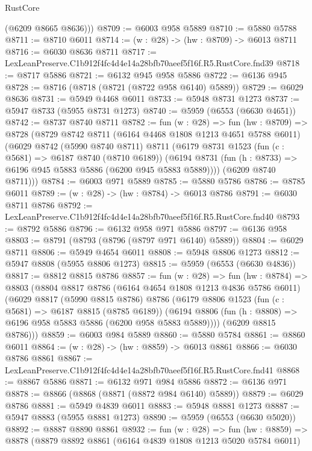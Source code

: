 \begin{lexlean}{RustCore}
\begin{coremodule}
        (@6209 @8665 @8636)))
@8709 := @6003 @958 @5889
@8710 := @5880 @5788
@8711 := @8710 @6011
@8714 := (w : @28) -> (hw : @8709) -> @6013 @8711
@8716 := @6030 @8636 @8711
@8717 := LexLeanPreserve.C1b912f4fc4d4e14a28bfb70aeef5f16f.R5.RustCore.fnd39
@8718 := @8717 @5886
@8721 := @6132 @945 @958 @5886
@8722 := @6136 @945
@8728 := @8716 (@8718 (@8721 (@8722 @958 @6140) @5889))
@8729 := @6029 @8636
@8731 := @5949 @4468 @6011
@8733 := @5948 @8731 @1273
@8737 := @5947 @8733 (@5955 @8731 @1273)
@8740 := @5959 (@6553 (@6630 @4651))
@8742 := @8737 @8740 @8711
@8782 := fun (w : @28) =>
  fun (hw : @8709) =>
  @8728
    (@8729
      @8742
      @8711
      (@6164 @4468 @1808 @1213 @4651 @5788 @6011)
      (@6029
        @8742
        (@5990 @8740 @8711)
        @8711
        (@6179
          @8731
          @1523
          (fun (c : @5681) => @6187 @8740 (@8710 @6189))
          (@6194 @8731 (fun (h : @8733) => @6196 @945 @5883 @5886 (@6200 @945 @5883 @5889))))
        (@6209 @8740 @8711)))
@8784 := @6003 @971 @5889
@8785 := @5880 @5786
@8786 := @8785 @6011
@8789 := (w : @28) -> (hw : @8784) -> @6013 @8786
@8791 := @6030 @8711 @8786
@8792 := LexLeanPreserve.C1b912f4fc4d4e14a28bfb70aeef5f16f.R5.RustCore.fnd40
@8793 := @8792 @5886
@8796 := @6132 @958 @971 @5886
@8797 := @6136 @958
@8803 := @8791 (@8793 (@8796 (@8797 @971 @6140) @5889))
@8804 := @6029 @8711
@8806 := @5949 @4654 @6011
@8808 := @5948 @8806 @1273
@8812 := @5947 @8808 (@5955 @8806 @1273)
@8815 := @5959 (@6553 (@6630 @4836))
@8817 := @8812 @8815 @8786
@8857 := fun (w : @28) =>
  fun (hw : @8784) =>
  @8803
    (@8804
      @8817
      @8786
      (@6164 @4654 @1808 @1213 @4836 @5786 @6011)
      (@6029
        @8817
        (@5990 @8815 @8786)
        @8786
        (@6179
          @8806
          @1523
          (fun (c : @5681) => @6187 @8815 (@8785 @6189))
          (@6194 @8806 (fun (h : @8808) => @6196 @958 @5883 @5886 (@6200 @958 @5883 @5889))))
        (@6209 @8815 @8786)))
@8859 := @6003 @984 @5889
@8860 := @5880 @5784
@8861 := @8860 @6011
@8864 := (w : @28) -> (hw : @8859) -> @6013 @8861
@8866 := @6030 @8786 @8861
@8867 := LexLeanPreserve.C1b912f4fc4d4e14a28bfb70aeef5f16f.R5.RustCore.fnd41
@8868 := @8867 @5886
@8871 := @6132 @971 @984 @5886
@8872 := @6136 @971
@8878 := @8866 (@8868 (@8871 (@8872 @984 @6140) @5889))
@8879 := @6029 @8786
@8881 := @5949 @4839 @6011
@8883 := @5948 @8881 @1273
@8887 := @5947 @8883 (@5955 @8881 @1273)
@8890 := @5959 (@6553 (@6630 @5020))
@8892 := @8887 @8890 @8861
@8932 := fun (w : @28) =>
  fun (hw : @8859) =>
  @8878
    (@8879
      @8892
      @8861
      (@6164 @4839 @1808 @1213 @5020 @5784 @6011)

\end{coremodule}
\end{lexlean}
